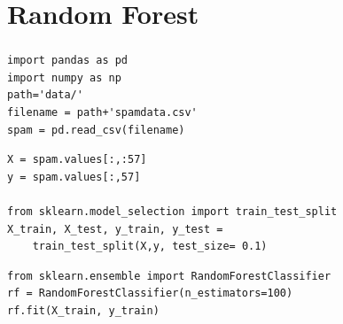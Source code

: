 \section{Random Forest}

\begin{frame}[fragile]\frametitle{}
\tiny	
\begin{lstlisting}
import pandas as pd
import numpy as np
path='data/'
filename = path+'spamdata.csv'
spam = pd.read_csv(filename)
\end{lstlisting} 
\pause
\begin{lstlisting}
X = spam.values[:,:57]
y = spam.values[:,57]

from sklearn.model_selection import train_test_split
X_train, X_test, y_train, y_test = 
	train_test_split(X,y, test_size= 0.1)
\end{lstlisting} 
\pause
\begin{lstlisting}
from sklearn.ensemble import RandomForestClassifier
rf = RandomForestClassifier(n_estimators=100)
rf.fit(X_train, y_train)
\end{lstlisting} 

\end{frame}




